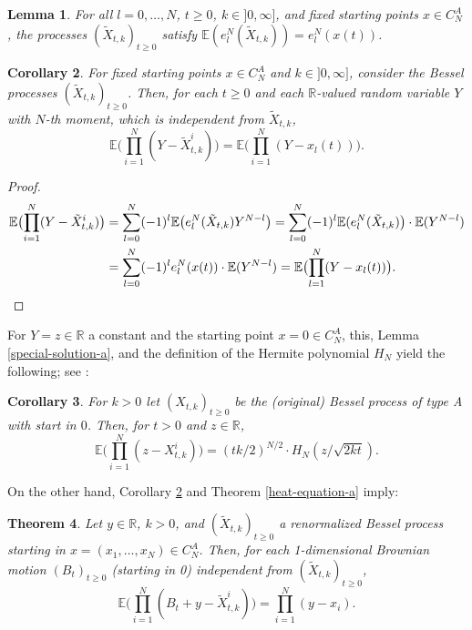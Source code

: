 \documentclass[reqno]{amsart}
\theoremstyle{plain}
\newtheorem{theorem}{Theorem}[section]
\newtheorem{corollary}[theorem]{Corollary}
\newtheorem{lemma}[theorem]{Lemma}
\theoremstyle{definition}
\numberwithin{equation}{section}
\begin{document}
\begin{lemma}\label{exp-independence-a} For all $ l=0,\ldots,N$, $t\ge0$, $k\in]0,\infty]$, and fixed starting points $x\in C_N^A$,
  the processes $(\tilde X_{t,k})_{t\ge0}$
   satisfy $\mathbb E( e_l^N(\tilde X_{t,k}))=  e_l^N(x(t))$.  
\end{lemma}



\begin{corollary}\label{exp-independence-a-cor} 
  For fixed starting points $x\in C_N^A$ and  $k\in]0,\infty]$, consider the Bessel processes $(\tilde X_{t,k})_{t\ge0}$. Then,  for
each $t\ge0$ and each $\mathbb R$-valued random variable $Y$ with $N$-th moment, which is independent from $\tilde X_{t,k}$,
$$\mathbb E\bigl(\prod_{i=1}^N (Y- \tilde X_{t,k}^i)\bigr)=\mathbb E\bigl(\prod_{i=1}^N (Y- x_l(t))\bigr).$$
\end{corollary}

\begin{proof}
\begin{align}\mathbb E\bigl(\prod_{i=1}^N (Y- \tilde X_{t,k}^i)\bigr)&=
\sum_{l=0}^N (-1)^l\mathbb E\bigl(e_l^N( \tilde X_{t,k}) Y^{N-l}\bigr)
=\sum_{l=0}^N (-1)^l\mathbb E(e_l^N(\tilde X_{t,k})\bigr) \cdot\mathbb E(Y^{N-l})\notag\\
&=\sum_{l=0}^N (-1)^l e_l^N( x(t)) \cdot\mathbb E(Y^{N-l})
=\mathbb E\bigl(\prod_{l=1}^N (Y- x_l(t))\bigr) .
\notag\end{align}
\end{proof}

For $Y=z\in\mathbb R$ a constant and the starting point $x=0\in C_N^A$, this, Lemma \ref{special-solution-a}, and the definition of
the Hermite polynomial $H_N$ yield the following; see \cite{KVW}:

\begin{corollary}\label{exp-independence-a-cor1}
  For $k>0$ let
$( X_{t,k})_{t\ge0}$ be the (original) Bessel process of type A with  start in $0$.
Then, for $t>0$ and $z\in\mathbb R$,
$$\mathbb E\bigl(\prod_{i=1}^N (z- X_{t,k}^i)\bigr)    = (tk/2)^{N/2}\cdot H_N(z/ \sqrt{2k t}).$$
\end{corollary}

On the other hand, Corollary \ref{exp-independence-a-cor} and Theorem \ref{heat-equation-a} imply:

\begin{theorem}\label{expectation-a}
  Let $y\in\mathbb R$, $k>0$, and  $(\tilde X_{t,k})_{t\ge0}$ a renormalized Bessel process starting in $x=(x_1,\ldots,x_N)\in C_N^A$.
  Then, for each 1-dimensional Brownian motion $(B_t)_{t\ge0} $ (starting in 0) independent from  $(\tilde X_{t,k})_{t\ge0}$,
  \begin{equation}\label{expect-final-new-a}
    \mathbb E\bigl(\prod_{i=1}^N (B_t+y- \tilde X_{t,k}^i)\bigr)=\prod_{i=1}^N (y- x_i).\end{equation}
\end{theorem}
\end{document}
